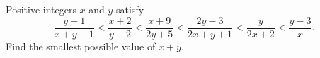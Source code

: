 Positive integers $x$ and $y$ satisfy
\[\dfrac{y-1}{x+y-1}<\dfrac{x+2}{y+2}<\dfrac{x+9}{2y+5}<\dfrac{2y-3}{2x+y+1}<\dfrac{y}{2x+2}<\dfrac{y-3}{x}.\]
Find the smallest possible value of $x+y$.

